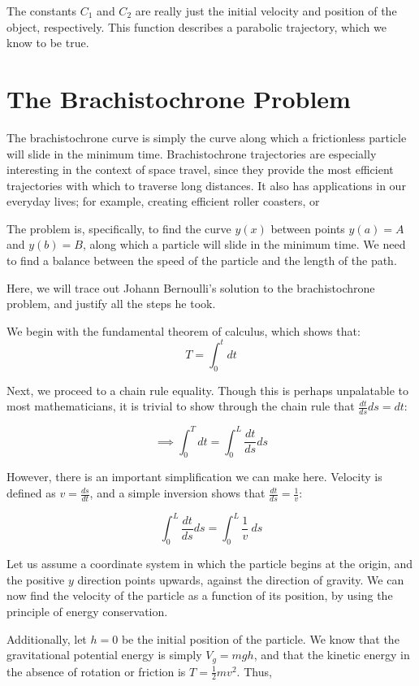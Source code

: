 \documentclass[%
 amsmath,amssymb,
aps,
 fleqn,
 notitlepage,
]{revtex4-2}
\begin{document}
The constants $C_1$ and $C_2$ are really just the initial velocity and position of the object, respectively.  This function describes a parabolic trajectory, which we know to be true.

\section{The Brachistochrone Problem} %

The brachistochrone curve is simply the curve along which a frictionless particle will slide in the minimum time. Brachistochrone trajectories are especially interesting in the context of space travel, since they provide the most efficient trajectories with which to traverse long distances. It also has applications in our everyday lives; for example, creating efficient roller coasters, or 

The problem is, specifically, to find the curve $y(x)$ between points $y(a) = A$ and $y(b) = B$, along which a particle will slide in the minimum time. We need to find a balance between the speed of the particle and the length of the path. 

Here, we will trace out Johann Bernoulli's solution to the brachistochrone problem, and justify all the steps he took.

We begin with the fundamental theorem of calculus, which shows that:
\[T = \int_0^t dt\]

Next, we proceed to a chain rule equality.  Though this is perhaps unpalatable to most mathematicians, it is trivial to show through the chain rule that $\frac{dt}{ds} ds = dt$:

\[\implies \int_0^T dt = \int_0^L \frac{dt}{ds} ds\]

However, there is an important simplification we can make here.  Velocity is defined as $v = \frac{ds}{dt}$, and a simple inversion shows that $\frac{dt}{ds} = \frac 1v$:

\[\int_0^L \frac{dt}{ds} ds = \int_0^L \frac 1v ~ ds\]

Let us assume a coordinate system in which the particle begins at the origin, and the positive $y$ direction points upwards, against the direction of gravity.  We can now find the velocity of the particle as a function of its position, by using the principle of energy conservation.

Additionally, let $h = 0$ be the initial position of the particle.  We know that the gravitational potential energy is simply $V_g = mgh$, and that the kinetic energy in the absence of rotation or friction is $T = \frac12 mv^2$.  Thus,
\end{document}
